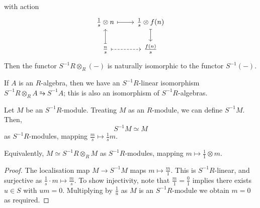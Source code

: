 with action
\[\begin{tikzcd}
	{\frac{1}{s} \otimes n} & {\frac{1}{s} \otimes f(n)} \\
	{\frac{n}{s}} & {\frac{f(n)}{s}}
	\arrow[maps to, from=2-1, to=1-1]
	\arrow[maps to, from=1-1, to=1-2]
	\arrow[maps to, from=1-2, to=2-2]
	\arrow[dashed, maps to, from=2-1, to=2-2]
\end{tikzcd}\]
Then the functor \( S^{-1}R \otimes_R (-) \) is naturally isomorphic to the functor \( S^{-1}(-) \).
\begin{remark}
    If \( A \) is an \( R \)-algebra, then we have an \( S^{-1}R \)-linear isomorphism \( S^{-1}R \otimes_R A \similarrightarrow S^{-1}A \); this is also an isomorphism of \( S^{-1}R \)-algebras.
\end{remark}
\begin{lemma}
    Let \( M \) be an \( S^{-1}R \)-module.
    Treating \( M \) as an \( R \)-module, we can define \( S^{-1}M \).
    Then,
    \[ S^{-1}M \simeq M \]
    as \( S^{-1}R \)-modules, mapping \( \frac{m}{s} \mapsto \frac{1}{s} m \).
\end{lemma}
Equivalently, \( M \simeq S^{-1}R \otimes_R M \) as \( S^{-1}R \)-modules, mapping \( m \mapsto \frac{1}{1} \otimes m \).
\begin{proof}
    The localisation map \( M \to S^{-1}M \) maps \( m \mapsto \frac{m}{1} \).
    This is \( S^{-1}R \)-linear, and surjective as \( \frac{1}{s} \cdot m \mapsto \frac{m}{s} \).
    To show injectivity, note that \( \frac{m}{1} = \frac{0}{1} \) implies there exists \( u \in S \) with \( um = 0 \).
    Multiplying by \( \frac{1}{u} \) as \( M \) is an \( S^{-1}R \)-module we obtain \( m = 0 \) as required.
\end{proof}

